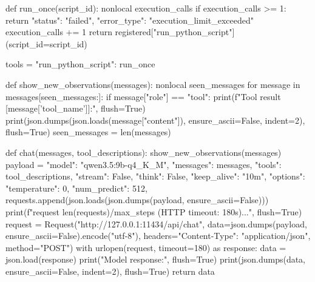 \documentclass[UTF8,zihao=-4,fontset=fandol]{ctexart}
\begin{document}
\begin{Code}
    def run_once(script_id):
        nonlocal execution_calls
        if execution_calls >= 1:
            return {"status": "failed", "error_type": "execution_limit_exceeded"}
        execution_calls += 1
        return registered["run_python_script"](script_id=script_id)

    tools = {"run_python_script": run_once}

    def show_new_observations(messages):
        nonlocal seen_messages
        for message in messages[seen_messages:]:
            if message["role"] == "tool":
                print(f"Tool result [{message['tool_name']}]:", flush=True)
                print(json.dumps(json.loads(message["content"]), ensure_ascii=False, indent=2), flush=True)
        seen_messages = len(messages)

    def chat(messages, tool_descriptions):
        show_new_observations(messages)
        payload = {
            "model": "qwen3.5:9b-q4_K_M", "messages": messages, "tools": tool_descriptions,
            "stream": False, "think": False, "keep_alive": "10m",
            "options": {"temperature": 0, "num_predict": 512},
        }
        requests.append(json.loads(json.dumps(payload, ensure_ascii=False)))
        print(f"\nModel request {len(requests)}/{max_steps} (HTTP timeout: 180s)...", flush=True)
        request = Request("http://127.0.0.1:11434/api/chat",
                          data=json.dumps(payload, ensure_ascii=False).encode("utf-8"),
                          headers={"Content-Type": "application/json"}, method="POST")
        with urlopen(request, timeout=180) as response:
            data = json.load(response)
        print("Model response:", flush=True)
        print(json.dumps(data, ensure_ascii=False, indent=2), flush=True)
        return data


\end{Code}
\end{document}
